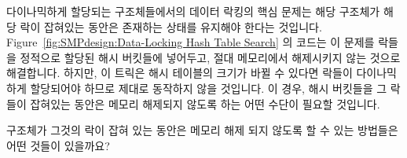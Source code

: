 다이나믹하게 할당되는 구조체들에서의 데이터 락킹의 핵심 문제는 해당 구조체가
해당 락이 잡혀있는 동안은 존재하는 상태를 유지해야 한다는 것입니다.
Figure~\ref{fig:SMPdesign:Data-Locking Hash Table Search} 의 코드는 이 문제를
락들을 정적으로 할당된 해시 버킷들에 넣어두고, 절대 메모리에서 해제시키지 않는
것으로 해결합니다.
하지만, 이 트릭은 해시 테이블의 크기가 바뀔 수 있다면 락들이 다이나믹하게
할당되어야 하므로 제대로 동작하지 않을 것입니다.
이 경우, 해시 버킷들을 그 락들이 잡혀있는 동안은 메모리 해제되지 않도록 하는
어떤 수단이 필요할 것입니다.

\QuickQuiz{}
	구조체가 그것의 락이 잡혀 있는 동안은 메모리 해제 되지 않도록 할 수
	있는 방법들은 어떤 것들이 있을까요?
	\iffalse

